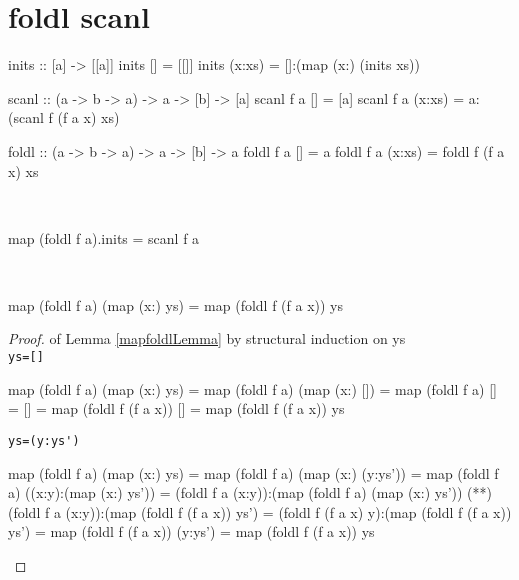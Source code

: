\section{foldl scanl}
\begin{code}
inits :: [a] -> [[a]]
inits []     = [[]]
inits (x:xs) = []:(map (x:) (inits xs))
\end{code}
\begin{code}
scanl :: (a -> b -> a) -> a -> [b] -> [a]
scanl f a []     = [a]
scanl f a (x:xs) = a:(scanl f  (f a x) xs)
\end{code}
\begin{code}
foldl :: (a -> b -> a) -> a -> [b] -> a
foldl f a []     = a
foldl f a (x:xs) = foldl f (f a x) xs
\end{code}
\begin{claim}\label{foldscanClaim}\ 
\begin{code}
map (foldl f a).inits = scanl f a
\end{code}
\end{claim}
\begin{lemma}\label{mapfoldlLemma}\ 
\begin{code}
map (foldl f a) (map (x:) ys) = map (foldl f (f a x)) ys
\end{code}
\end{lemma}
\begin{proof} of Lemma \ref{mapfoldlLemma} by structural induction on ys\\
\verb|ys=[]|
\begin{code}
map (foldl f a) (map (x:) ys)
           = map (foldl f a) (map (x:) [])
           = map (foldl f a) []
           = []
           = map (foldl f (f a x)) []
           = map (foldl f (f a x)) ys
\end{code}
\verb|ys=(y:ys')|
\begin{code}
map (foldl f a) (map (x:) ys)
           = map (foldl f a) (map (x:) (y:ys'))
           = map (foldl f a) ((x:y):(map (x:) ys'))
           = (foldl f a (x:y)):(map (foldl f a) (map (x:) ys'))
           (*\sEq{IH}*) (foldl f a (x:y)):(map (foldl f (f a x)) ys')
           = (foldl f (f a x) y):(map (foldl f (f a x)) ys')
           = map (foldl f (f a x)) (y:ys')
           = map (foldl f (f a x)) ys
\end{code}
\end{proof}
\newpage

